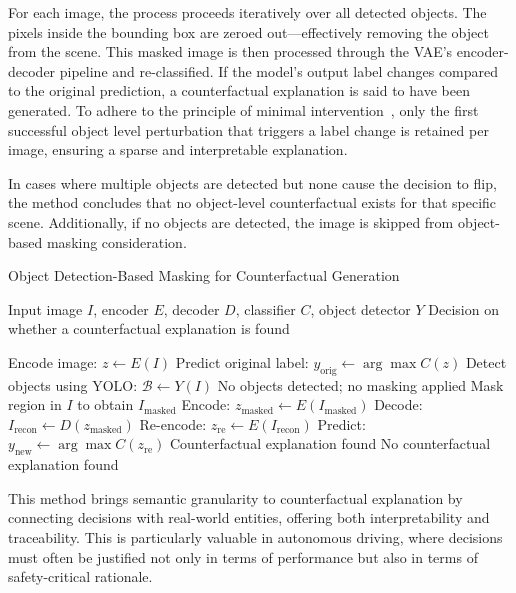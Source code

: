 For each image, the process proceeds iteratively over all detected objects. The pixels inside the bounding box are zeroed out—effectively removing the object from the scene. This masked image is then processed through the VAE's encoder-decoder pipeline and re-classified. If the model's output label changes compared to the original prediction, a counterfactual explanation is said to have been generated. To adhere to the principle of minimal intervention~\cite{wachter2018CE}, only the first successful object level perturbation that triggers a label change is retained per image, ensuring a sparse and interpretable explanation.

In cases where multiple objects are detected but none cause the decision to flip, the method concludes that no object-level counterfactual exists for that specific scene. Additionally, if no objects are detected, the image is skipped from object-based masking consideration.

\vspace{1em}
\begin{algorithm}[H]
\caption{Object Detection-Based Masking for Counterfactual Generation}
\label{alg:object_detection_masking}
\begin{algorithmic}[1]
\REQUIRE Input image $I$, encoder $E$, decoder $D$, classifier $C$, object detector $Y$
\ENSURE Decision on whether a counterfactual explanation is found

\STATE Encode image: $z \leftarrow E(I)$
\STATE Predict original label: $y_{\text{orig}} \leftarrow \arg\max C(z)$
\STATE Detect objects using YOLO: $\mathcal{B} \leftarrow Y(I)$
    \RETURN No objects detected; no masking applied
\ENDIF
{}
    \STATE Mask region in $I$ to obtain $I_{\text{masked}}$
    \STATE Encode: $z_{\text{masked}} \leftarrow E(I_{\text{masked}})$
    \STATE Decode: $I_{\text{recon}} \leftarrow D(z_{\text{masked}})$
    \STATE Re-encode: $z_{\text{re}} \leftarrow E(I_{\text{recon}})$
    \STATE Predict: $y_{\text{new}} \leftarrow \arg\max C(z_{\text{re}})$
        \RETURN Counterfactual explanation found
    \ENDIF
\ENDFOR
\RETURN No counterfactual explanation found
\end{algorithmic}
\end{algorithm}
\vspace{1em}

This method brings semantic granularity to counterfactual explanation by connecting decisions with real-world entities, offering both interpretability and traceability. This is particularly valuable in autonomous driving, where decisions must often be justified not only in terms of performance but also in terms of safety-critical rationale.


